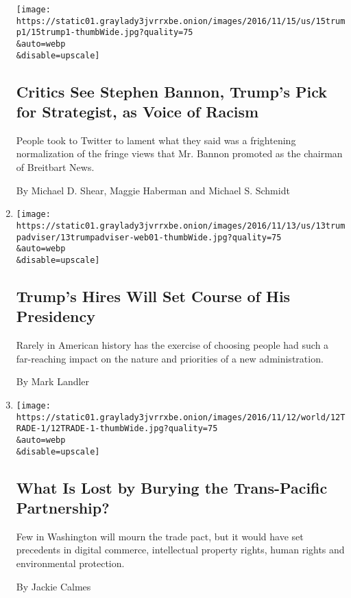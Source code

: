 \begin{enumerate}
  \texttt{[image: https://static01.graylady3jvrrxbe.onion/images/2016/11/15/us/15trump1/15trump1-thumbWide.jpg?quality=75\\\&auto=webp\\\&disable=upscale]}

  \hypertarget{critics-see-stephen-bannon-trumps-pick-for-strategist-as-voice-of-racism}{%
  \subsection{Critics See Stephen Bannon, Trump's Pick for Strategist,
  as Voice of
  Racism}\label{critics-see-stephen-bannon-trumps-pick-for-strategist-as-voice-of-racism}}

  People took to Twitter to lament what they said was a frightening
  normalization of the fringe views that Mr. Bannon promoted as the
  chairman of Breitbart News.

  By Michael D. Shear, Maggie Haberman and Michael S. Schmidt
\item
  \href{/2016/11/13/us/politics/donald-trump-administration-appointments.html}{}

  \texttt{[image: https://static01.graylady3jvrrxbe.onion/images/2016/11/13/us/13trumpadviser/13trumpadviser-web01-thumbWide.jpg?quality=75\\\&auto=webp\\\&disable=upscale]}

  \hypertarget{trumps-hires-will-set-course-of-his-presidency}{%
  \subsection{Trump's Hires Will Set Course of His
  Presidency}\label{trumps-hires-will-set-course-of-his-presidency}}

  Rarely in American history has the exercise of choosing people had
  such a far-reaching impact on the nature and priorities of a new
  administration.

  By Mark Landler
\item
  \href{/2016/11/12/business/economy/donald-trump-trade-tpp-trans-pacific-partnership.html}{}

  \texttt{[image: https://static01.graylady3jvrrxbe.onion/images/2016/11/12/world/12TRADE-1/12TRADE-1-thumbWide.jpg?quality=75\\\&auto=webp\\\&disable=upscale]}

  \hypertarget{what-is-lost-by-burying-the-trans-pacific-partnership}{%
  \subsection{What Is Lost by Burying the Trans-Pacific
  Partnership?}\label{what-is-lost-by-burying-the-trans-pacific-partnership}}

  Few in Washington will mourn the trade pact, but it would have set
  precedents in digital commerce, intellectual property rights, human
  rights and environmental protection.

  By Jackie Calmes
\end{enumerate}

